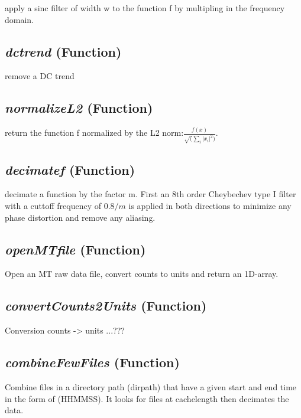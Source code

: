apply a sinc filter of width w to the function f by multipling in the frequency domain.

\subsection{\textit{dctrend} (Function)}
\label{ssec:core.mttools.dctrend}

remove a DC trend

\subsection{\textit{normalizeL2} (Function)}
\label{ssec:core.mttools.normalizeL2}

return the function f normalized by the L2 norm:$  \frac{f(x)}{\sqrt(\sum_i |x_i|^2 )}$.

\subsection{\textit{decimatef} (Function)}
\label{ssec:core.mttools.decimatef}

decimate a function by the factor m. First an 8th order Cheybechev 
    type I filter with a cuttoff frequency of $0.8/m$ is applied in both 
    directions to minimize any phase distortion and remove any aliasing.

\subsection{\textit{openMTfile} (Function)}
\label{ssec:core.mttools.openMTfile}

Open an MT raw data file, convert counts to units and return an 1D-array.

\subsection{\textit{convertCounts2Units} (Function)}
\label{ssec:core.mttools.convertCounts2Units}

Conversion counts -> units ...???

\subsection{\textit{combineFewFiles} (Function)}
\label{ssec:core.mttools.combineFewFiles}

Combine files in a directory path (dirpath) that have a given start and 
    end time in the form of (HHMMSS).  It looks for files at cachelength then 
    decimates the data.

